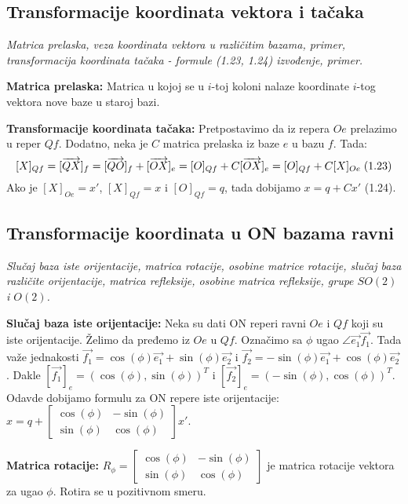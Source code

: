 \documentclass[12pt]{article}
\newcommand{\vek}[1]{\overrightarrow{#1}}
\begin{document}
\subsection{Transformacije koordinata vektora i tačaka}
\textit{Matrica prelaska, veza koordinata vektora u različitim bazama,
    primer, transformacija koordinata tačaka - formule (1.23, 1.24)
    izvođenje, primer.}
\par
\vspace*{1cm}

\textbf{Matrica prelaska:} Matrica u kojoj se u $i$-toj koloni nalaze
koordinate $i$-tog vektora nove baze u staroj bazi.
\par

\textbf{Transformacije koordinata tačaka:} Pretpostavimo da iz repera $Oe$
prelazimo u reper $Qf$. Dodatno, neka je $C$ matrica prelaska iz baze $e$ u
bazu $f$. Tada:
$$[X]_{Qf}=[\vek{QX}]_f=[\vek{QO}]_f+[\vek{OX}]_e=[O]_{Qf}+C[\vek{OX}]_e=[O]_{Qf}+C[X]_{Oe}\hspace*{0.1cm}\text{(1.23)}$$
Ako je $[X]_{Oe}=x'$, $[X]_{Qf}=x$ i $[O]_{Qf}=q$, tada dobijamo $x=q+Cx'$ (1.24).

\subsection{Transformacije koordinata u ON bazama ravni}
\label{subsec:pitanje_9}
\textit{Slučaj baza iste orijentacije, matrica rotacije, osobine matrice
    rotacije, slučaj baza različite orijentacije, matrica refleksije,
    osobine matrica refleksije, grupe $SO(2)$ i $O(2)$.}
\par

\vspace*{1cm}

\textbf{Slučaj baza iste orijentacije:} Neka su dati ON reperi ravni $Oe$ i $Qf$
koji su iste orijentacije. Želimo da pređemo iz $Oe$ u $Qf$. Označimo sa $\phi$
ugao $\angle{\vek{e_1}\vek{f_1}}$. Tada važe jednakosti
$\vek{f_1}=\cos(\phi)\vek{e_1}+\sin(\phi)\vek{e_2}$ i
$\vek{f_2}=-\sin(\phi)\vek{e_1}+\cos(\phi)\vek{e_2}$. Dakle
$[\vek{f_1}]_e=(\cos(\phi),\sin(\phi))^T$ i $[\vek{f_2}]_e=(-\sin(\phi),\cos(\phi))^T$.
Odavde dobijamo formulu za ON repere iste orijentacije: $x=q+\begin{bmatrix}
        \cos(\phi) & -\sin(\phi) \\
        \sin(\phi) & \cos(\phi)
    \end{bmatrix} x'$.
\par

\textbf{Matrica rotacije:} $R_\phi=\begin{bmatrix}
        \cos(\phi) & -\sin(\phi) \\
        \sin(\phi) & \cos(\phi)
    \end{bmatrix}$ je matrica rotacije vektora za ugao $\phi$. Rotira se u
pozitivnom smeru.
\par
\end{document}
